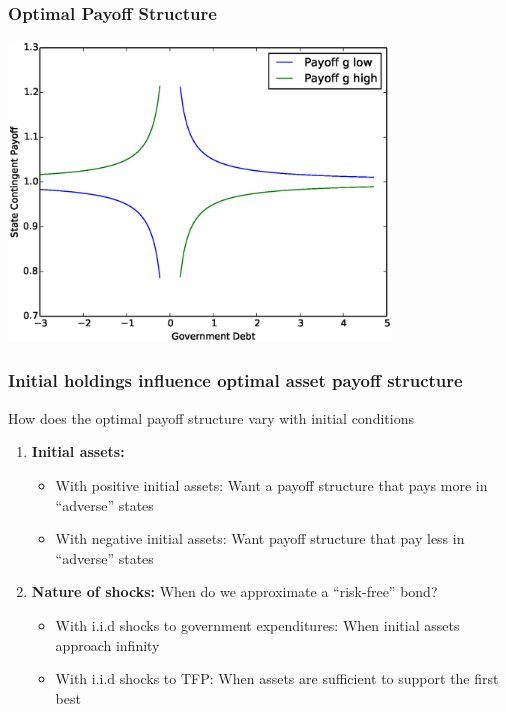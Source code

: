 \documentclass{beamer}
\begin{document}
  \begin{frame}
   \frametitle{Optimal Payoff Structure }
	\begin{center}
		\includegraphics[width = 4in]{Images/p_graph.eps}
	\end{center}
  \end{frame}

  \begin{frame}
   \frametitle{Initial holdings influence optimal asset payoff structure}
How does the optimal payoff structure vary with initial conditions
\begin{enumerate}
\item \textbf{Initial assets: }
\begin{itemize}

 \item With positive initial assets: Want a payoff structure that pays more in ``adverse'' states
 \item With negative initial assets: Want payoff structure that pay less in ``adverse'' states
\end{itemize}

 \item \textbf{Nature of shocks: } When do we approximate a ``risk-free'' bond?
 \begin{itemize}
  \item With i.i.d shocks to government expenditures: When initial assets approach  infinity
  \item With i.i.d  shocks to  TFP: When assets are sufficient to support the first best
 \end{itemize}

\end{enumerate}



  \end{frame}
\end{document}
